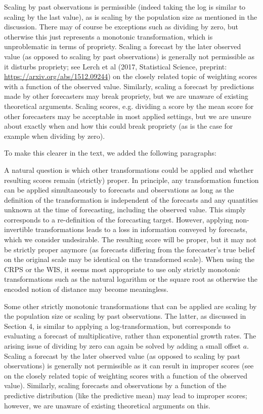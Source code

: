 \documentclass{article}
\newcommand{\indented}{\setlength{\leftskip}{1cm}}
\begin{document}
Scaling by past observations is permissible (indeed taking the log is similar to scaling by the last value), as is scaling by the population size as mentioned in the discussion. There may of course be exceptions such as dividing by zero, but otherwise this just represents a monotonic transformation, which is unproblematic in terms of propriety. Scaling a forecast by the later observed value (as opposed to scaling by past observations) is generally not permissible as it disturbs propriety; see Lerch et al (2017, Statistical Science, preprint: \url{https://arxiv.org/abs/1512.09244}) on the closely related topic of weighting scores with a function of the observed value. Similarly, scaling a forecast by predictions made by other forecasters may break propriety, but we are unaware of existing theoretical arguments. Scaling scores, e.g. dividing a score by the mean score for other forecasters may be acceptable in most applied settings, but we are unsure about exactly when and how this could break propriety (as is the case for example when dividing by zero). 

To make this clearer in the text, we added the following paragraphs: 

\indented
A natural question is which other transformations could be applied and whether resulting scores remain (strictly) proper. In principle, any transformation function can be applied simultaneously to forecasts and observations as long as the definition of the transformation is independent of the forecasts and any quantities unknown at the time of forecasting, including the observed value. This simply corresponds to a re-definition of the forecasting target. However, applying non-invertible transformations leads to a loss in information conveyed by forecasts, which we consider undesirable. The resulting score will be proper, but it may not be strictly proper anymore (as forecasts differing from the forecaster's true belief on the original scale may be identical on the transformed scale). When using the CRPS or the WIS, it seems most appropriate to use only strictly monotonic transformations such as the natural logarithm or the square root as otherwise the encoded notion of distance may become meaningless. 

Some other strictly monotonic transformations that can be applied are scaling by the population size or scaling by past observations. The latter, as discussed in Section 4, is similar to applying a log-transformation, but corresponds to evaluating a forecast of multiplicative, rather than exponential growth rates. The arising issue of dividing by zero can again be solved by adding a small offset $a$. Scaling a forecast by the later observed value (as opposed to scaling by past observations) is generally not permissible as it can result in improper scores (see \citealt{lerchForecasterDilemmaExtreme2015} on the closely related topic of weighting scores with a function of the observed value). Similarly, scaling forecasts and observations by a function of the predictive distribution (like the predictive mean) may lead to improper scores; however, we are unaware of existing theoretical arguments on this. 
\end{document}
